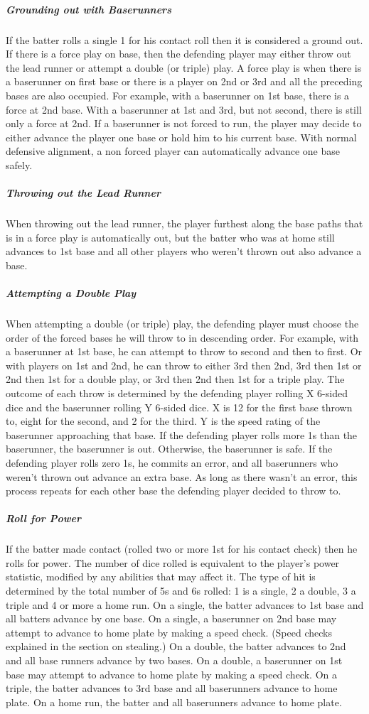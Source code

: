 \documentclass[12pt]{article} %
\begin{document}
\subparagraph{Grounding out with Baserunners}
If the batter rolls a single 1 for his contact roll then it is considered a ground out.  If there is a force play on base, then the defending player may either throw out the lead runner or attempt a double (or triple) play.  A force play is when there is a baserunner on first base or there is a player on 2nd or 3rd and all the preceding bases are also occupied.  For example, with a baserunner on 1st base, there is a force at 2nd base.  With a baserunner at 1st and 3rd, but not second, there is still only a force at 2nd.  If a baserunner is not forced to run, the player may decide to either advance the player one base or hold him to his current base.  With normal defensive alignment, a non forced player can automatically advance one base safely.  

\subparagraph{Throwing out the Lead Runner}
When throwing out the lead runner, the player furthest along the base paths that is in a force play is automatically out, but the batter who was at home still advances to 1st base and all other players who weren't thrown out also advance a base.  

\subparagraph{Attempting a Double Play}
When attempting a double (or triple) play, the defending player must choose the order of the forced bases he will throw to in descending order.  For example, with a baserunner at 1st base, he can attempt to throw to second and then to first.  Or with players on 1st and 2nd, he can throw to either 3rd then 2nd, 3rd then 1st or 2nd then 1st for a double play, or 3rd then 2nd then 1st for a triple play.  The outcome of each throw is determined by the defending player rolling X 6-sided dice and the baserunner rolling Y 6-sided dice.  X is 12 for the first base thrown to, eight for the second, and 2 for the third.  Y is the speed rating of the baserunner approaching that base.  If the defending player rolls more 1s than the baserunner, the baserunner is out.  Otherwise, the baserunner is safe.  If the defending player rolls zero 1s, he commits an error, and all baserunners who weren't thrown out advance an extra base.  As long as there wasn't an error, this process repeats for each other base the defending player decided to throw to.  

\subparagraph{Roll for Power}
If the batter made contact (rolled two or more 1st for his contact check) then he rolls for power.  The number of dice rolled is equivalent to the player's power statistic, modified by any abilities that may affect it.  The type of hit is determined by the total number of 5s and 6s rolled:  1 is a single, 2 a double, 3 a triple and 4 or more a home run.  On a single, the batter advances to 1st base and all batters advance by one base.  On a single, a baserunner on 2nd base may attempt to advance to home plate by making a speed check.  (Speed checks explained in the section on stealing.) On a double, the batter advances to 2nd and all base runners advance by two bases.  On a double, a baserunner on 1st base may attempt to advance to home plate by making a speed check.  On a triple, the batter advances to 3rd base and all baserunners advance to home plate.  On a home run, the batter and all baserunners advance to home plate.
\end{document}
